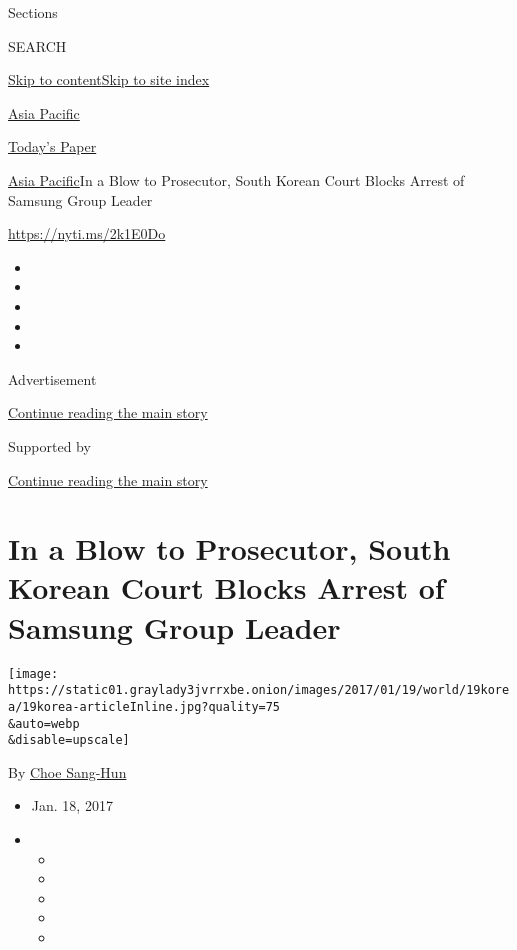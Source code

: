 Sections

SEARCH

\protect\hyperlink{site-content}{Skip to
content}\protect\hyperlink{site-index}{Skip to site index}

\href{https://www.nytimes3xbfgragh.onion/section/world/asia}{Asia
Pacific}

\href{https://myaccount.nytimes3xbfgragh.onion/auth/login?response_type=cookie\&client_id=vi}{}

\href{https://www.nytimes3xbfgragh.onion/section/todayspaper}{Today's
Paper}

\href{/section/world/asia}{Asia Pacific}\textbar{}In a Blow to
Prosecutor, South Korean Court Blocks Arrest of Samsung Group Leader

\url{https://nyti.ms/2k1E0Do}

\begin{itemize}
\item
\item
\item
\item
\item
\end{itemize}

Advertisement

\protect\hyperlink{after-top}{Continue reading the main story}

Supported by

\protect\hyperlink{after-sponsor}{Continue reading the main story}

\hypertarget{in-a-blow-to-prosecutor-south-korean-court-blocks-arrest-of-samsung-group-leader}{%
\section{In a Blow to Prosecutor, South Korean Court Blocks Arrest of
Samsung Group
Leader}\label{in-a-blow-to-prosecutor-south-korean-court-blocks-arrest-of-samsung-group-leader}}

\texttt{[image: https://static01.graylady3jvrrxbe.onion/images/2017/01/19/world/19korea/19korea-articleInline.jpg?quality=75\\\&auto=webp\\\&disable=upscale]}

By \href{http://www.nytimes3xbfgragh.onion/by/choe-sang-hun}{Choe
Sang-Hun}

\begin{itemize}
\item
  Jan. 18, 2017
\item
  \begin{itemize}
  \item
  \item
  \item
  \item
  \item
  \end{itemize}
\end{itemize}

